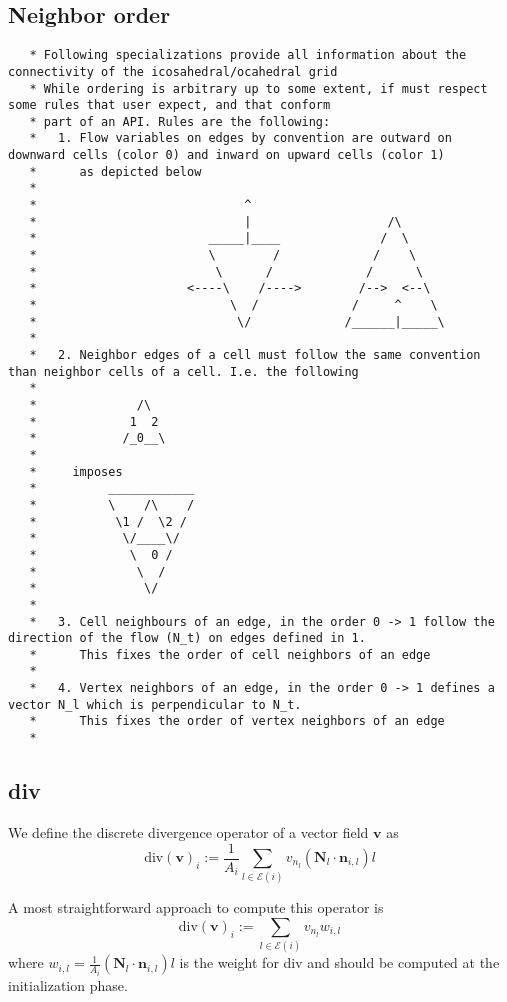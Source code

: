 \documentclass[12pt]{article}
\begin{document}
\subsection{Neighbor order}
\begin{lstlisting}
   * Following specializations provide all information about the connectivity of the icosahedral/ocahedral grid
   * While ordering is arbitrary up to some extent, if must respect some rules that user expect, and that conform
   * part of an API. Rules are the following:
   *   1. Flow variables on edges by convention are outward on downward cells (color 0) and inward on upward cells (color 1)
   *      as depicted below
   *
   *                             ^
   *                             |                   /\
   *                        _____|____              /  \
   *                        \        /             /    \
   *                         \      /             /      \
   *                     <----\    /---->        /-->  <--\
   *                           \  /             /     ^    \
   *                            \/             /______|_____\
   *
   *   2. Neighbor edges of a cell must follow the same convention than neighbor cells of a cell. I.e. the following
   *
   *              /\
   *             1  2
   *            /_0__\
   *
   *     imposes
   *          ____________
   *          \    /\    /
   *           \1 /  \2 /
   *            \/____\/
   *             \  0 /
   *              \  /
   *               \/
   *
   *   3. Cell neighbours of an edge, in the order 0 -> 1 follow the direction of the flow (N_t) on edges defined in 1.
   *      This fixes the order of cell neighbors of an edge
   *
   *   4. Vertex neighbors of an edge, in the order 0 -> 1 defines a vector N_l which is perpendicular to N_t.
   *      This fixes the order of vertex neighbors of an edge
   *
\end{lstlisting}
\subsection{div}
We define the discrete divergence operator of a vector field $\bm{v}$ as
\begin{equation}
  \label{div}
  \text{div}(\bm{v})_i := \frac{1}{A_i}\sum\limits_{l\in\mathcal{E}(i)}v_{n_l}(\bm{N}_l\cdot\bm{n}_{i,l})l
\end{equation}

A most straightforward approach to compute this operator is
\begin{equation}
  \label{div1}
  \text{div}(\bm{v})_i := \sum\limits_{l\in\mathcal{E}(i)}v_{n_l}w_{i,l}
\end{equation}
where $w_{i,l} = \frac{1}{A_i}(\bm{N}_l\cdot\bm{n}_{i,l})l$ is the weight for div and should be computed at the initialization phase.
\end{document}
